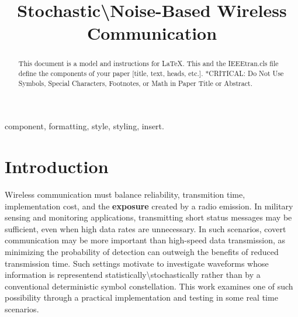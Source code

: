 \documentclass[conference]{IEEEtran}
\begin{document}
\title{Stochastic\textbackslash  Noise-Based Wireless Communication\\
}

\author{
\and
{}
\and
{}
}
\maketitle

\begin{abstract}
This document is a model and instructions for \LaTeX.
This and the IEEEtran.cls file define the components of your paper [title, text, heads, etc.]. *CRITICAL: Do Not Use Symbols, Special Characters, Footnotes, 
or Math in Paper Title or Abstract.
\end{abstract}

\begin{IEEEkeywords}
component, formatting, style, styling, insert.
\end{IEEEkeywords}

\section{Introduction}
Wireless communication must balance reliability, transmition time, implementation cost, and the \textbf{exposure} created by a radio emission. In military sensing and monitoring applications, transmitting short status messages may be sufficient, even when high data rates are unnecessary. In such scenarios, covert communication may be more important than high-speed data transmission, as minimizing the probability of detection can outweigh the benefits of reduced transmission time. Such settings motivate to investigate waveforms whose information is representend statistically\textbackslash stochastically rather than by a conventional deterministic symbol constellation. This work examines one of such possibility through a practical implementation and testing in some real time scenarios. 
\end{document}
